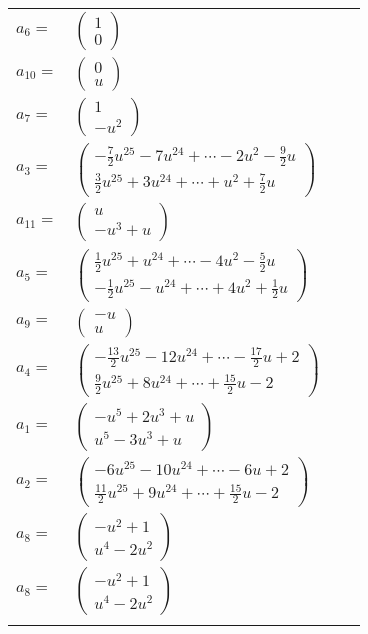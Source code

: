 \documentclass[1p]{elsarticle_modified}
\theoremstyle{definition}
\begin{document}
\begin{tabular}{m{7pt} m{180pt} m{7pt} m{180pt} }
\flushright $a_{6}=$&$\begin{pmatrix}1\\0\end{pmatrix}$ \\
\flushright $a_{10}=$&$\begin{pmatrix}0\\u\end{pmatrix}$ \\
\flushright $a_{7}=$&$\begin{pmatrix}1\\- u^2\end{pmatrix}$ \\
\flushright $a_{3}=$&$\begin{pmatrix}-\frac{7}{2} u^{25}-7 u^{24}+\cdots-2 u^2-\frac{9}{2} u\\\frac{3}{2} u^{25}+3 u^{24}+\cdots+u^2+\frac{7}{2} u\end{pmatrix}$ \\
\flushright $a_{11}=$&$\begin{pmatrix}u\\- u^3+u\end{pmatrix}$ \\
\flushright $a_{5}=$&$\begin{pmatrix}\frac{1}{2} u^{25}+u^{24}+\cdots-4 u^2-\frac{5}{2} u\\-\frac{1}{2} u^{25}- u^{24}+\cdots+4 u^2+\frac{1}{2} u\end{pmatrix}$ \\
\flushright $a_{9}=$&$\begin{pmatrix}- u\\u\end{pmatrix}$ \\
\flushright $a_{4}=$&$\begin{pmatrix}-\frac{13}{2} u^{25}-12 u^{24}+\cdots-\frac{17}{2} u+2\\\frac{9}{2} u^{25}+8 u^{24}+\cdots+\frac{15}{2} u-2\end{pmatrix}$ \\
\flushright $a_{1}=$&$\begin{pmatrix}- u^5+2 u^3+u\\u^5-3 u^3+u\end{pmatrix}$ \\
\flushright $a_{2}=$&$\begin{pmatrix}-6 u^{25}-10 u^{24}+\cdots-6 u+2\\\frac{11}{2} u^{25}+9 u^{24}+\cdots+\frac{15}{2} u-2\end{pmatrix}$ \\
\flushright $a_{8}=$&$\begin{pmatrix}- u^2+1\\u^4-2 u^2\end{pmatrix}$\\ \flushright $a_{8}=$&$\begin{pmatrix}- u^2+1\\u^4-2 u^2\end{pmatrix}$\\&\end{tabular}
\end{document}

